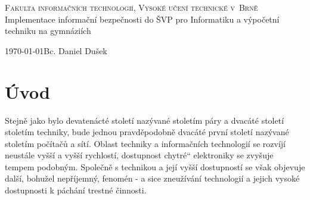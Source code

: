\documentclass[a4paper, 11pt]{article}
\title{\thesisname}
\author{Bc. Daniel Dušek}
\providecommand{\uv}[1]{\quotedblbase #1\textquotedblleft}
\newcommand{\thesisname}{Implementace informační bezpečnosti do ŠVP pro Informatiku a výpočetní techniku na gymnáziích}
\begin{document}
\thispagestyle{empty}
\begin{center}
\Huge
\textsc{Fakulta informačních technologií, Vysoké učení technické v~Brně}\\
\LARGE
{}
\thesisname
{}
\end{center}
{\Large \today \hfill Bc. Daniel Dušek}





\newpage
\tableofcontents

\newpage
\setcounter{page}{1}
\section{Úvod}


% 




Stejně jako bylo devatenácté století nazývané stoletím páry a dvacáté století stoletím techniky, bude jednou pravděpodobně dvacáté první století nazývané stoletím počítačů a sítí. Oblast techniky a informačních technologií se rozvíjí neustále vyšší a vyšší rychlostí, dostupnost \uv{chytré} elektroniky se zvyšuje tempem podobným. Společně s technikou a její vyšší dostupností se však objevuje další, bohužel nepříjemný, fenomén \-- a sice zneužívání technologií a jejich vysoké dostupnosti k páchání trestné činnosti. 
\end{document}
